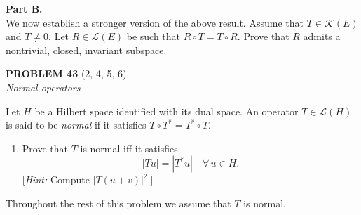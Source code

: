 \documentclass[12pt]{article}
\newcommand{\abs}[1]{\left|#1\right|}
\begin{document}
\noindent\textbf{Part B.}\\
We now establish a stronger version of the above result. Assume that $T \in \mathcal{K}(E)$
and $T \neq 0$. Let $R \in \mathcal{L}(E)$ be such that $R \circ T = T \circ R$. Prove that $R$ admits a
nontrivial, closed, invariant subspace.
 
\noindent[\textit{Hint:} Set $\mathcal{B} = \operatorname{span}\{I, R, R^2, \ldots\}$ and $\mathcal{B}y = \{Sy;\; S \in \mathcal{B}\}$.
Check that all the steps in part A still hold with $\mathcal{A}$ replaced by $\mathcal{B}$ and $\mathcal{A}y$ by $\mathcal{B}y$.]
 
\bigskip
 
\noindent\textbf{PROBLEM 43} (2, 4, 5, 6)\\[4pt]
\textit{Normal operators}
 
\medskip
 
Let $H$ be a Hilbert space identified with its dual space. An operator $T \in \mathcal{L}(H)$ is
said to be \emph{normal} if it satisfies $T \circ T^* = T^* \circ T$.
 
\begin{enumerate}
\item Prove that $T$ is normal iff it satisfies
\[
\abs{Tu} = \abs{T^* u} \quad \forall\, u \in H.
\]
[\textit{Hint:} Compute $\abs{T(u+v)}^2$.]
\end{enumerate}
 
\noindent Throughout the rest of this problem we assume that $T$ is normal.
 
\end{document}
